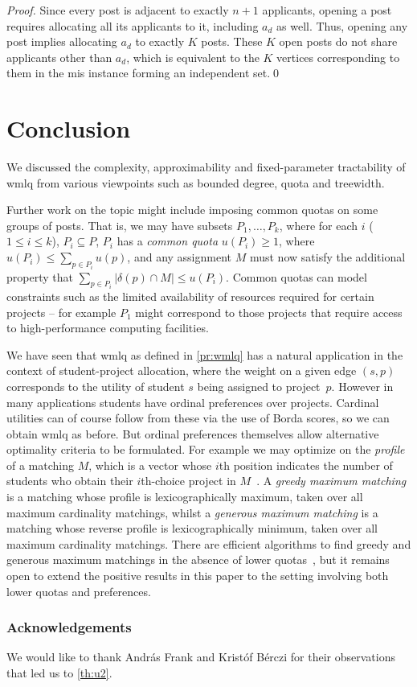 \documentclass{llncs}
\begin{document}
\begin{proof}
    Since every post is adjacent to exactly $n + 1$ applicants, opening a post requires allocating all its applicants to it, including $a_d$ as well. Thus, opening any post implies allocating $a_d$ to exactly $K$ posts. These $K$ open posts do not share applicants other than $a_d$, which is equivalent to the $K$ vertices corresponding to them in the {\sc mis} instance forming an independent set.\qed
\end{proof}

\section{Conclusion}

We discussed the complexity, approximability and fixed-parameter tractability of {\sc wmlq} from various viewpoints such as bounded degree, quota and treewidth.

Further work on the topic might include imposing common quotas on some groups of posts. That is, we may have subsets $P_1,\dots,P_k$, where for each $i$ ($1\leq i\leq k$), $P_i\subseteq P$, $P_i$ has a \emph{common quota} $u(P_i)\geq 1$, where $u(P_i)\leq \sum_{p\in P_i}u(p)$, and any assignment $M$ must now satisfy the additional property that $\sum_{p\in P_i} |\delta(p)\cap M|\leq u(P_i)$. Common quotas can model constraints such as the limited availability of resources required for certain projects -- for example $P_1$ might correspond to those projects that require access to high-performance computing facilities.

We have seen that {\sc wmlq} as defined in \cref{pr:wmlq} has a natural application in the context of student-project allocation, where the weight on a given edge $(s,p)$ corresponds to the utility of student $s$ being assigned to project~$p$. However in many applications students have ordinal preferences over projects. Cardinal utilities can of course follow from these via the use of Borda scores, so we can obtain {\sc wmlq} as before.  But ordinal preferences themselves allow alternative optimality criteria to be formulated. For example we may optimize on the \emph{profile} of a matching $M$, which is a vector whose $i$th position indicates the number of students who obtain their $i$th-choice project in $M$~\cite{Man13}. A \emph{greedy maximum matching} is a matching whose profile is lexicographically maximum, taken over all maximum cardinality matchings, whilst a \emph{generous maximum matching} is a matching whose reverse profile is lexicographically minimum, taken over all maximum cardinality matchings. There are efficient algorithms to find greedy and generous maximum matchings in the absence of lower quotas~\cite{KIMS15}, but it remains open to extend the positive results in this paper to the setting involving both lower quotas and preferences.

\subsubsection*{Acknowledgements}
We would like to thank Andr\'as Frank and Krist\'of B\'erczi for their observations that led us to \cref{th:u2}.

 
\end{document}
